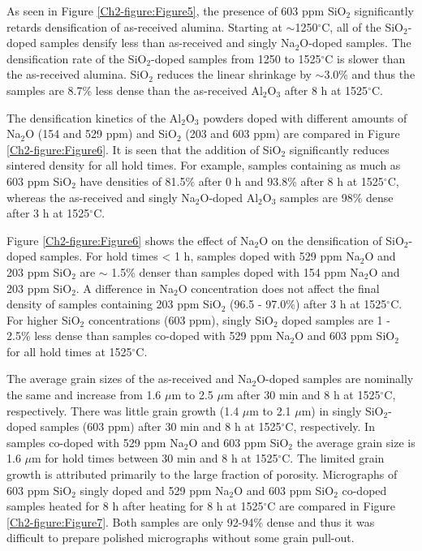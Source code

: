 As seen in Figure \ref{Ch2-figure:Figure5}, the presence of 603 ppm SiO$_{2}$ significantly retards densification of as-received alumina. Starting at $\sim$1250$^{\circ}$C, all of the SiO$_{2}$-doped samples densify less than as-received and singly Na$_{2}$O-doped samples. The densification rate of the SiO$_{2}$-doped samples from 1250 to 1525$^{\circ}$C is slower than the as-received alumina. SiO$_{2}$ reduces the linear shrinkage by $\sim$3.0\% and thus the samples are 8.7\% less dense than the as-received Al$_{2}$O$_{3}$ after 8 h at 1525$^{\circ}$C. 

The densification kinetics of the Al$_{2}$O$_{3}$ powders doped with different amounts of Na$_{2}$O (154 and 529 ppm) and SiO$_{2}$ (203 and 603 ppm) are compared in Figure \ref{Ch2-figure:Figure6}. It is seen that the addition of SiO$_{2}$ significantly reduces sintered density for all hold times. For example, samples containing as much as 603 ppm SiO$_{2}$ have densities of 81.5\% after 0 h and 93.8\% after 8 h at 1525$^{\circ}$C, whereas the as-received and singly Na$_{2}$O-doped Al$_{2}$O$_{3}$ samples are 98\% dense after 3 h at 1525$^{\circ}$C. 

Figure \ref{Ch2-figure:Figure6} shows the effect of Na$_{2}$O on the densification of SiO$_{2}$-doped samples. For hold times < 1 h, samples doped with 529 ppm Na$_{2}$O and 203 ppm SiO$_{2}$ are $\sim$ 1.5\% denser than samples doped with 154 ppm Na$_{2}$O and 203 ppm SiO$_{2}$. A difference in Na$_{2}$O concentration does not affect the final density of samples containing 203 ppm SiO$_{2}$ (96.5 - 97.0\%) after 3 h at 1525$^{\circ}$C. For higher SiO$_{2}$ concentrations (603 ppm), singly SiO$_{2}$ doped samples are 1 - 2.5\% less dense than samples co-doped with 529 ppm Na$_{2}$O and 603 ppm SiO$_{2}$ for all hold times at 1525$^{\circ}$C. 

The average grain sizes of the as-received and Na$_{2}$O-doped samples are nominally the same and increase from 1.6 $\mu$m to 2.5 $\mu$m after 30 min and 8 h at 1525$^{\circ}$C, respectively. There was little grain growth (1.4 $\mu$m to 2.1 $\mu$m) in singly SiO$_{2}$-doped samples (603 ppm) after 30 min and 8 h at 1525$^{\circ}$C, respectively. In samples co-doped with 529 ppm Na$_{2}$O and 603 ppm SiO$_{2}$ the average grain size is 1.6 $\mu$m for hold times between 30 min and 8 h at 1525$^{\circ}$C. The limited grain growth is attributed primarily to the large fraction of porosity. Micrographs of 603 ppm SiO$_{2}$ singly doped and 529 ppm Na$_{2}$O and 603 ppm SiO$_{2}$ co-doped samples heated for 8 h after heating for 8 h at 1525$^{\circ}$C are compared in Figure \ref{Ch2-figure:Figure7}. Both samples are only 92-94\% dense and thus it was difficult to prepare polished micrographs without some grain pull-out. 

